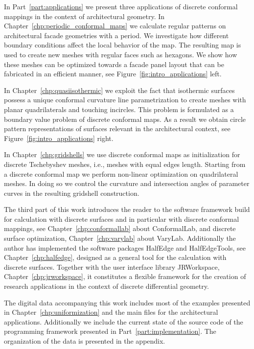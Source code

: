 \documentclass[Thesis.tex]{subfiles}
\begin{document}
In Part~\ref{part:applications} we present three applications of discrete conformal mappings in the context of architectural geometry. 
In Chapter~\ref{chp:periodic_conformal_maps} we calculate regular patterns on architectural facade geometries with a period. 
We investigate how different boundary conditions affect the local behavior of the map.
The resulting map is used to create new meshes with regular faces such as hexagons.
We show how these meshes can be optimized towards a facade panel layout that can be fabricated in an efficient manner, see Figure~\ref{fig:intro_applications} left.

In Chapter~\ref{chp:quasiisothermic} we exploit the fact that isothermic surfaces possess a unique conformal curvature line parametrization to create meshes with planar quadrilaterals and touching incircles. 
This problem is formulated as a boundary value problem of discrete conformal maps.
As a result we obtain circle pattern representations of surfaces relevant in the architectural context, see Figure~\ref{fig:intro_applications} right.

In Chapter~\ref{chp:gridshells} we use discrete conformal maps as initialization for discrete Tschebyshev meshes, i.e., meshes with equal edges length. 
Starting from a discrete conformal map we perform non-linear optimization on quadrilateral meshes.
In doing so we control the curvature and intersection angles of parameter curves in the resulting gridshell construction.

The third part of this work introduces the reader to the software framework build for calculation with discrete surfaces and in particular with discrete conformal mappings, see Chapter~\ref{chp:conformallab}  about {\sc ConformalLab}, and discrete surface optimization, Chapter~\ref{chp:varylab} about {\sc VaryLab}. 
Additionally the author has implemented the software packages {\sc HalfEdge} and {\sc HalfEdgeTools}, see Chapter~\ref{chp:halfedge}, designed as a general tool for the calculation with discrete surfaces. 
Together with the user interface library {\sc JRWorkspace}, Chapter~\ref{chp:jrworkspace}, it constitutes a flexible framework for the creation of research applications in the context of discrete differential geometry. 

The digital data accompanying this work includes most of the examples presented in Chapter~\ref{chp:uniformization} and the main files for the architectural applications. 
Additionally we include the current state of the source code of the programming framework presented in Part~\ref{part:implementation}. 
The organization of the data is presented in the appendix.
\end{document}
